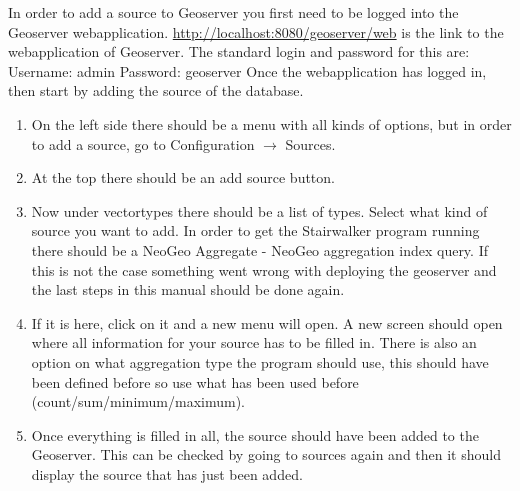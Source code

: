 In order to add a source to Geoserver you first need to be logged into the Geoserver webapplication. \url{http://localhost:8080/geoserver/web} is the link to the webapplication of Geoserver. The standard login and password for this are:
\newline
\newline
Username: admin
\noindent Password: geoserver
\newline
\newline
Once the webapplication has logged in, then start by adding the source of the database. 
\begin{enumerate}
	\item On the left side there should be a menu with all kinds of options, but in order to add a source, go to Configuration $\rightarrow$ Sources. 
	\item At the top there should be an add source button. 
	\item Now under vectortypes there should be a list of types. Select what kind of source you want to add. In order to get the Stairwalker program running there should be a NeoGeo Aggregate - NeoGeo aggregation index query. If this is not the case something went wrong with deploying the geoserver and the last steps in this manual should be done again. 
	\item If it is here, click on it and a new menu will open. A new screen should open where all information for your source has to be filled in. There is also an option on what aggregation type the program should use, this should have been defined before so use what has been used before (count/sum/minimum/maximum). 
	\item Once everything is filled in all, the source should have been added to the Geoserver. This can be checked by going to sources again and then it should display the source that has just been added.
\end{enumerate}